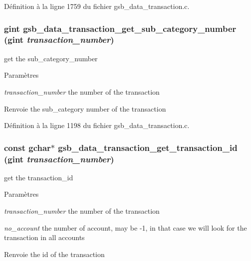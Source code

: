 Définition à la ligne 1759 du fichier gsb\_\-data\_\-transaction.c.

\subsubsection[{gsb\_\-data\_\-transaction\_\-get\_\-sub\_\-category\_\-number}]{\setlength{\rightskip}{0pt plus 5cm}gint gsb\_\-data\_\-transaction\_\-get\_\-sub\_\-category\_\-number (gint {\em transaction\_\-number})}\label{gsb__data__transaction_8h_a2e0ed6fbd584d4363d75e4b0155660b7}
get the sub\_\-category\_\-number 
\begin{DoxyParams}{Paramètres}
\item[{\em transaction\_\-number}]the number of the transaction \end{DoxyParams}
\begin{DoxyReturn}{Renvoie}
the sub\_\-category number of the transaction 
\end{DoxyReturn}


Définition à la ligne 1198 du fichier gsb\_\-data\_\-transaction.c.

\subsubsection[{gsb\_\-data\_\-transaction\_\-get\_\-transaction\_\-id}]{\setlength{\rightskip}{0pt plus 5cm}const gchar$\ast$ gsb\_\-data\_\-transaction\_\-get\_\-transaction\_\-id (gint {\em transaction\_\-number})}\label{gsb__data__transaction_8h_ad171eaf081403c90154beddf8521983f}
get the transaction\_\-id 
\begin{DoxyParams}{Paramètres}
\item[{\em transaction\_\-number}]the number of the transaction \item[{\em no\_\-account}]the number of account, may be -\/1, in that case we will look for the transaction in all accounts \end{DoxyParams}
\begin{DoxyReturn}{Renvoie}
the id of the transaction 
\end{DoxyReturn}


